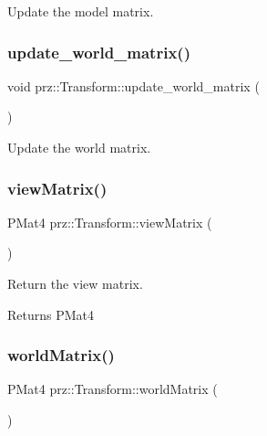 Update the model matrix. 

\mbox{\label{classprz_1_1_transform_a0575ce053e514816a99c97a340f582be}} 
\subsubsection{\texorpdfstring{update\_world\_matrix()}{update\_world\_matrix()}}
{\footnotesize\ttfamily void prz\+::\+Transform\+::update\+\_\+world\+\_\+matrix (\begin{DoxyParamCaption}{ }\end{DoxyParamCaption})\hspace{0.3cm}{\ttfamily [protected]}}



Update the world matrix. 

\mbox{\label{classprz_1_1_transform_a2e5dce185d946609698e708e0898c909}} 
\subsubsection{\texorpdfstring{viewMatrix()}{viewMatrix()}}
{\footnotesize\ttfamily P\+Mat4 prz\+::\+Transform\+::view\+Matrix (\begin{DoxyParamCaption}{ }\end{DoxyParamCaption})}



Return the view matrix. 

\begin{DoxyReturn}{Returns}
P\+Mat4 
\end{DoxyReturn}
\mbox{\label{classprz_1_1_transform_a070208f421673057bf4cd311a3cc05f3}} 
\subsubsection{\texorpdfstring{worldMatrix()}{worldMatrix()}}
{\footnotesize\ttfamily P\+Mat4 prz\+::\+Transform\+::world\+Matrix (\begin{DoxyParamCaption}{ }\end{DoxyParamCaption})}



